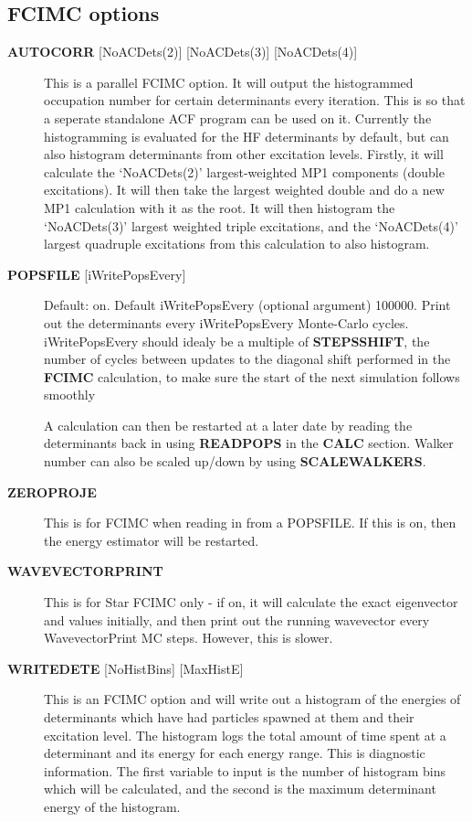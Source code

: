 \documentclass[openany,a4paper,10pt]{manual}
\begin{document}
\subsection{FCIMC options}
\begin{description}
\item[\textbf{AUTOCORR} {[}NoACDets(2){]} {[}NoACDets(3){]} {[}NoACDets(4){]}]
This is a parallel FCIMC option. It will output the histogrammed occupation number for certain
determinants every iteration. This is so that a seperate standalone ACF program can be used on it.
Currently the histogramming is evaluated for the HF determinants by default, but can also
histogram determinants from other excitation levels. Firstly, it will calculate the `NoACDets(2)'
largest-weighted MP1 components (double excitations). It will then take the largest weighted double
and do a new MP1 calculation with it as the root. It will then histogram the `NoACDets(3)' largest
weighted triple excitations, and the `NoACDets(4)' largest quadruple excitations from this calculation
to also histogram.

\item[\textbf{POPSFILE} {[}iWritePopsEvery{]}]
Default: on.  Default iWritePopsEvery (optional argument) 100000.
Print out the determinants every iWritePopsEvery Monte-Carlo cycles.
iWritePopsEvery should idealy be a multiple of \textbf{STEPSSHIFT}, the number of
cycles between updates to the diagonal shift performed in the
\textbf{FCIMC} calculation, to make sure the start of the next simulation follows
smoothly

A calculation can then be restarted at a later date by reading the
determinants back in using \textbf{READPOPS} in the \textbf{CALC} section.
Walker number can also be scaled up/down by using \textbf{SCALEWALKERS}.

\item[\textbf{ZEROPROJE}]
This is for FCIMC when reading in from a POPSFILE. If this is on, then the energy
estimator will be restarted.

\item[\textbf{WAVEVECTORPRINT}]
This is for Star FCIMC only - if on, it will calculate the exact eigenvector and
values initially, and then print out the running wavevector every
WavevectorPrint MC steps. However, this is slower.

\item[\textbf{WRITEDETE} {[}NoHistBins{]} {[}MaxHistE{]}]
This is an FCIMC option and will write out a histogram of the energies of determinants which have
had particles spawned at them and their excitation level. The histogram logs the total
amount of time spent at a determinant and its energy for each energy range. This is diagnostic
information. The first variable to input is the number of histogram bins which will be calculated,
and the second is the maximum determinant energy of the histogram.

\end{description}
\end{document}
